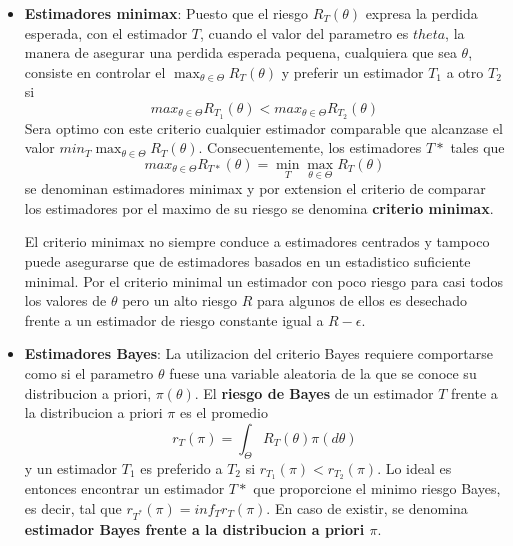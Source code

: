 \documentclass[10pt]{extarticle}
\newcommand{\<}{\langle}
\renewcommand{\>}{\rangle}
\theoremstyle{definition}
\begin{document}
\begin{itemize}
  \item \textbf{Estimadores minimax}: Puesto que el riesgo $R_T(\theta)$ expresa la perdida esperada, con el estimador $T$, cuando el valor del parametro es $theta$, la manera de asegurar una perdida esperada pequena, cualquiera que sea $\theta$, consiste en controlar el $\max_{\theta \in \Theta} R_T(\theta)$ y preferir un estimador $T_1$ a otro $T_2$ si
        \begin{equation*}
          max_{\theta \in \Theta} R_{T_1}(\theta) < max_{\theta \in \Theta}R_{T_2}(\theta)
        \end{equation*}
        Sera optimo con este criterio cualquier estimador comparable que alcanzase el valor $min_T \max_{\theta \in \Theta}R_T(\theta)$. Consecuentemente, los estimadores $T*$ tales que
        \begin{equation*}
          max_{\theta \in \Theta} R_{T*}(\theta) = \min_T \max_{\theta \in \Theta}R_T(\theta)
        \end{equation*}
        se denominan estimadores minimax y por extension el criterio de comparar los estimadores por el maximo de su riesgo se denomina \textbf{criterio minimax}.

        El criterio minimax no siempre conduce a estimadores centrados y tampoco puede asegurarse que de estimadores basados en un estadistico suficiente minimal. Por el criterio minimal un estimador con poco riesgo para casi todos los valores de $\theta$ pero un alto riesgo $R$ para algunos de ellos es desechado frente a un estimador de riesgo constante igual a $R-\epsilon$.
  \item \textbf{Estimadores Bayes}: La utilizacion del criterio Bayes requiere comportarse como si el parametro $\theta$ fuese una variable aleatoria de la que se conoce su distribucion a priori, $\pi(\theta)$. El \textbf{riesgo de Bayes} de un estimador $T$ frente a la distribucion a priori $\pi$ es el promedio
        \begin{equation*}
          r_T(\pi) = \int_{\Theta} R_T(\theta) \pi(d\theta)
        \end{equation*}
        y un estimador $T_1$ es preferido a $T_2$ si $r_{T_1}(\pi)<r_{T_2}(\pi)$. Lo ideal es entonces encontrar un estimador $T*$ que proporcione el minimo riesgo Bayes, es decir, tal que $r_{T^*}(\pi)=inf_T r_T(\pi)$. En caso de existir, se denomina \textbf{estimador Bayes frente a la distribucion a priori $\pi$}.


\end{itemize}
\end{document}
